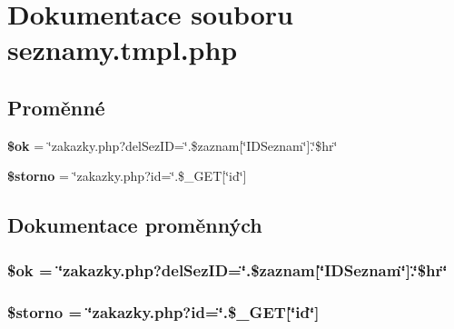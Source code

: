 \section{Dokumentace souboru seznamy.tmpl.php}
\label{seznamy_8tmpl_8php}
\subsection*{Proměnné}
\begin{CompactItemize}
\item 
{\bf \$ok} = \char`\"{}zakazky.php?delSezID=\char`\"{}.\$zaznam[\char`\"{}IDSeznam\char`\"{}].\char`\"{}\$hr\char`\"{}
\item 
{\bf \$storno} = \char`\"{}zakazky.php?id=\char`\"{}.\$\_\-GET[\char`\"{}id\char`\"{}]
\end{CompactItemize}


\subsection{Dokumentace proměnných}
\subsubsection{\setlength{\rightskip}{0pt plus 5cm}\$ok = \char`\"{}zakazky.php?delSezID=\char`\"{}.\$zaznam[\char`\"{}IDSeznam\char`\"{}].\char`\"{}\$hr\char`\"{}}\label{seznamy_8tmpl_8php_012dd629d5f0d054d55d809aa87ecd33}


\subsubsection{\setlength{\rightskip}{0pt plus 5cm}\$storno = \char`\"{}zakazky.php?id=\char`\"{}.\$\_\-GET[\char`\"{}id\char`\"{}]}\label{seznamy_8tmpl_8php_b080a1420e8af0c1b6c5e2841d4286b1}


